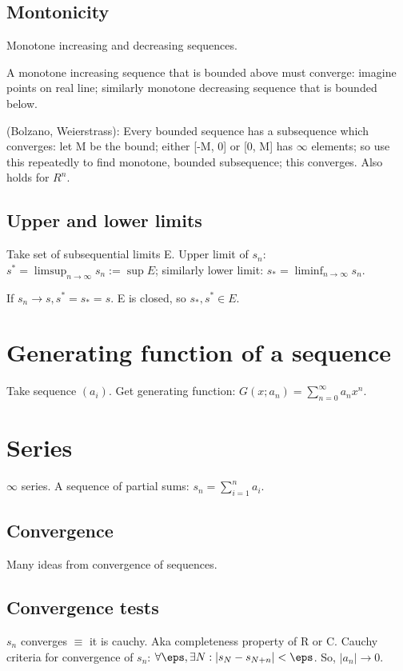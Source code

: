 \documentclass[oneside, article]{memoir}
\begin{document}
\subsection{Montonicity}
Monotone increasing and decreasing sequences.

A monotone increasing sequence that is bounded above must converge: imagine points on real line; similarly monotone decreasing sequence that is bounded below.

(Bolzano, Weierstrass): Every bounded sequence has a subsequence which converges: let M be the bound; either [-M, 0] or [0, M] has $\infty$ elements; so use this repeatedly to find monotone, bounded subsequence; this converges. Also holds for $R^{n}$.

\subsection{Upper and lower limits}
Take set of subsequential limits E. Upper limit of $s_{n}$: $s^{*} = \limsup_{n \to \infty}s_{n} := \sup E$; similarly lower limit: $s_{*} = \liminf_{n \to \infty}s_{n}$.

If $s_{n} \to s, s^{*} = s_{*} = s$. E is closed, so $s_{*}, s^{*} \in E$.

\section{Generating function of a sequence}
Take sequence $(a_i)$. Get generating function: $G(x; a_n) = \sum_{n=0}^{\infty}a_n x^{n}$.

\section{Series}
$\infty$ series. A sequence of partial sums: $s_{n} = \sum_{i=1}^{n} a_{i}$.

\subsection{Convergence}
Many ideas from convergence of sequences.

\subsection{Convergence tests}
$s_{n}$ converges $\equiv$ it is cauchy. Aka completeness property of R or C. Cauchy criteria for convergence of $s_{n}$: $\forall \eps, \exists N: |s_{N}-s_{N+n}|< \eps$. So, $|a_{n}| \to 0$.
\end{document}

